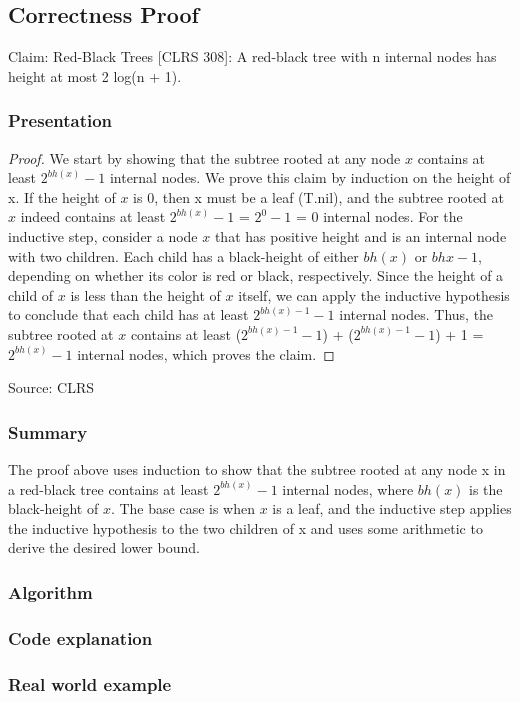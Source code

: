 \documentclass[10pt]{article}
\begin{document}
  \subsection*{Correctness Proof}


  Claim: Red-Black Trees [CLRS 308]: A red-black tree with n internal nodes has
  height at most 2 log(n + 1).

  \subsubsection*{Presentation}


  \begin{proof}
    We start by showing that the subtree rooted at any node $x$ contains at least
    $2^{bh(x)}- 1$ internal nodes. We prove this claim by induction on the
    height of x. If the height of $x$ is 0, then x must be a leaf (T.nil), and the
    subtree rooted at $x$ indeed contains at least $2^{bh(x)}- 1$ = $2^{0}- 1$ =
    0 internal nodes. For the inductive step, consider a node $x$ that has positive
    height and is an internal node with two children. Each child has a black-height
    of either $bh(x)$ or $bhx - 1$, depending on whether its color is red or black,
    respectively. Since the height of a child of $x$ is less than the height of $x$
    itself, we can apply the inductive hypothesis to conclude that each child
    has at least $2^{bh(x) - 1}- 1$ internal nodes. Thus, the subtree rooted at
    $x$ contains at least ($2^{bh(x) - 1}- 1$) + ($2^{bh(x) - 1}- 1$) + 1 =
    $2^{bh(x)}- 1$ internal nodes, which proves the claim.
  \end{proof}

  \noindent
  Source: CLRS

  \subsubsection*{Summary}


  The proof above uses induction to show that the subtree rooted at any node x
  in a red-black tree contains at least $2^{bh(x)}- 1$ internal nodes, where $bh(
  x)$ is the black-height of $x$. The base case is when $x$ is a leaf, and the inductive
  step applies the inductive hypothesis to the two children of x and uses some arithmetic
  to derive the desired lower bound.

  \subsubsection*{Algorithm}


  \subsubsection*{Code explanation}


  \subsubsection*{Real world example}
\end{document}
